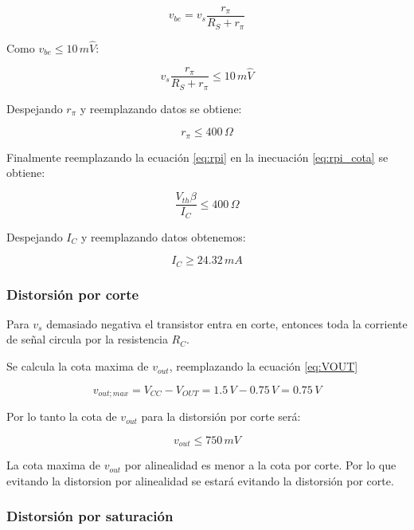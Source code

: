 \documentclass[10pt,spanish,a4paper,openany,notitlepage]{article}
\begin{document}
\[ \displaystyle v_{be} = v_s \frac{r_\pi}{R_S + r_\pi} \]

Como $v_{be} \leqslant 10\, \unit{m\widehat{V}}$:

\[ \displaystyle v_s \frac{r_\pi}{R_S + r_\pi} \leqslant 10\,\unit{m\widehat{V}}\]

Despejando $r_\pi$ y reemplazando datos se obtiene:

\begin{equation}
r_\pi \leqslant 400\, \unit{\Omega}
\label{eq:rpi_cota}
\end{equation}

Finalmente reemplazando la ecuación \ref{eq:rpi} en la inecuación \ref{eq:rpi_cota}
se obtiene:

\[ \displaystyle \frac{V_{th} \beta}{I_C} \leqslant 400\, \unit{\Omega} \]

Despejando $I_C$ y reemplazando datos obtenemos:

\begin{equation}
I_C \geqslant 24.32\, \unit{mA}
\label{eq:IC_alinealidad}
\end{equation}

\subsubsection{Distorsión por corte}

Para $v_s$ demasiado negativa el transistor entra en corte, entonces
toda la corriente de señal circula por la resistencia $R_C$.

Se calcula la cota maxima de $v_{out}$, reemplazando la ecuación \ref{eq:VOUT}

\[ \displaystyle v_{out;max} = V_{CC} - V_{OUT} = 1.5\, \unit{V} - 0.75\, \unit{V} = 0.75\, \unit{V} \]

Por lo tanto la cota de $v_{out}$ para la distorsión por corte será:

\begin{equation}
v_{out} \leqslant 750\, \unit{mV}
\label{eq:vout_corte}
\end{equation}

La cota maxima de $v_{out}$ por alinealidad es menor a la cota por corte. Por
lo que evitando la distorsion por alinealidad se estará evitando la
distorsión por corte.

\subsubsection{Distorsión por saturación}
\end{document}
